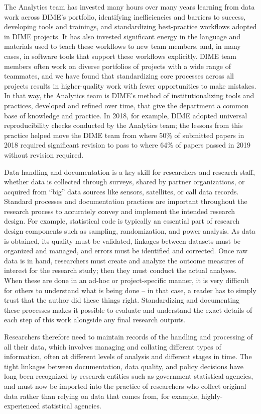 The Analytics team has invested many hours over many years
learning from data work across DIME's portfolio,
identifying inefficiencies and barriers to success,
developing tools and trainings, and standardizing best-practice workflows adopted in DIME projects.
It has also invested significant energy in the language and materials
used to teach these workflows to new team members,
and, in many cases, in software tools that support these workflows explicitly.
DIME team members often work on diverse portfolios of projects
with a wide range of teammates, and we have found
that standardizing core processes across all projects
results in higher-quality work with fewer opportunities to make mistakes.
In that way, the Analytics team is DIME's method of institutionalizing
tools and practices, developed and refined over time,
that give the department a common base of knowledge and practice.
In 2018, for example, DIME adopted universal reproducibility checks
conducted by the Analytics team;
the lessons from this practice helped move the DIME team
from where 50\% of submitted papers in 2018
required significant revision to pass
to where 64\% of papers passed in 2019 without revision required.

Data handling and documentation is a key skill for researchers and research staff,
whether data is collected through surveys, shared by partner organizations,
or acquired from ``big'' data sources like sensors, satellites, or call data records.
Standard processes and documentation practices
are important throughout the research process to accurately convey
and implement the intended research design.\cite{vilhuber_lars_2020_3911311}
For example, statistical code is typically an essential part of
research design components such as sampling, randomization, and power analysis.
As data is obtained, its quality must be validated,
linkages between datasets must be organized and managed,
and errors must be identified and corrected.
Once raw data is in hand, researchers must create and analyze the
outcome measures of interest for the research study;
then they must conduct the actual analyses.
When these are done in an ad-hoc or project-specific manner,
it is very difficult for others to understand what is being done --
in that case, a reader has to simply trust that the author did these things right.
Standardizing and documenting these processes
makes it possible to evaluate and understand
the exact details of each step of this work
alongside any final research outputs.

Researchers therefore need to maintain records of the handling and processing of all their data,
which involves managing and collating different types of information,
often at different levels of analysis and different stages in time.
The tight linkages between documentation, data quality, and policy decisions
have long been recognized by research entities such as government statistical agencies,\cite{jepdataquality}
and must now be imported into the practice of researchers who collect original data
rather than relying on data that comes from, for example, highly-experienced statistical agencies.

